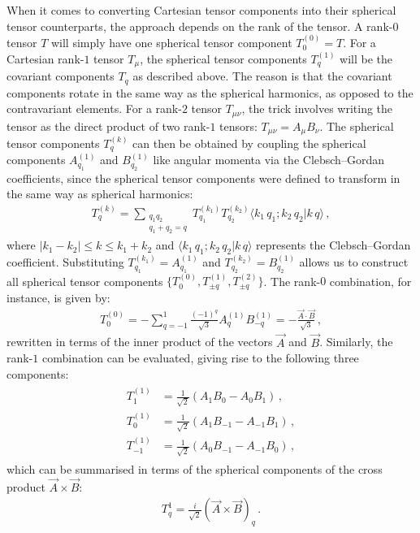 \documentclass[../Thesis-IJspeert.tex]{subfiles}
\begin{document}
When it comes to converting Cartesian tensor components into their spherical tensor counterparts, the approach depends on the rank of the tensor. A rank-$0$ tensor $T$ will simply have one spherical tensor component $T_0^{(0)}=T$. For a Cartesian rank-$1$ tensor $T_\mu$, the spherical tensor components $T^{(1)}_q$ will be the covariant components $T_q$ as described above. The reason is that the covariant components rotate in the same way as the spherical harmonics, as opposed to the contravariant elements. For a rank-$2$ tensor $T_{\mu\nu}$, the trick involves writing the tensor as the direct product of two rank-$1$ tensors: $T_{\mu\nu}=A_\mu B_\nu$. The spherical tensor components $T_q^{(k)}$ can then be obtained by coupling the spherical components $A^{(1)}_{q_1}$ and $B^{(1)}_{q_2}$ like angular momenta via the Clebsch–Gordan coefficients, since the spherical tensor components were defined to transform in the same way as spherical harmonics:
\begin{align}
T_q^{(k)}=\sum_{\substack{q_1q_2\\
		q_1+q_2=q}} T^{(k_1)}_{q_1} T^{(k_2)}_{q_2} \langle k_1\, q_1 ; k_2\, q_2 \vert k\, q \rangle\,,
\end{align}
where $\vert k_1 - k_2 \vert \le k \le k_1 + k_2$ and $\langle k_1\, q_1 ; k_2\, q_2 \vert k\, q \rangle$ represents the Clebsch–Gordan coefficient. Substituting $T^{(k_1)}_{q_1}=A^{(1)}_{q_1}$ and $T^{(k_2)}_{q_2}=B^{(1)}_{q_2}$ allows us to construct all spherical tensor components $\{T_0^{(0)}, T_{\pm q}^{(1)}, T_{\pm q}^{(2)}\}$. The rank-$0$ combination, for instance, is given by:
\begin{align}
T_0^{(0)}=-\sum_{q=-1}^{1} \frac{(-1)^q}{\sqrt{3}}A^{(1)}_q B^{(1)}_{-q}=-\frac{\vec{A}\cdot\vec{B}}{\sqrt{3}}\,,
\end{align}
rewritten in terms of the inner product of the vectors $\vec{A}$ and $\vec{B}$. Similarly, the rank-$1$ combination can be evaluated, giving rise to the following three components:
\begin{align}
\begin{split}
T_1^{(1)} &= \frac{1}{\sqrt{2}}(A_1B_0-A_0B_1)\,,\\
T_0^{(1)} &= \frac{1}{\sqrt{2}}(A_1B_{-1}-A_{-1}B_1)\,,\\
T_{-1}^{(1)} &= \frac{1}{\sqrt{2}}(A_0B_{-1}-A_{-1}B_0)\,,
\end{split}
\end{align}
which can be summarised in terms of the spherical components of the cross product $\vec{A}\times\vec{B}$:
\begin{align}
T_q^{1}=\frac{i}{\sqrt{2}}(\vec{A}\times\vec{B})_q\,.
\end{align}
\end{document}
